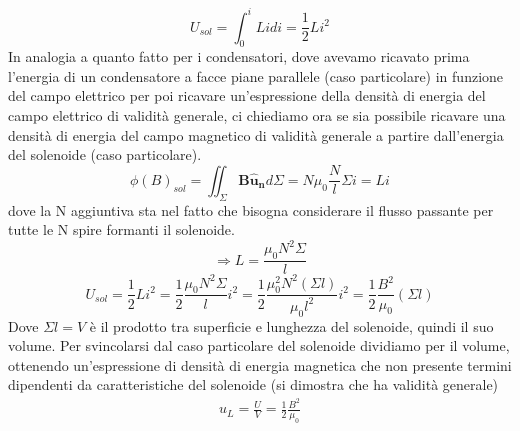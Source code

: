 \documentclass[
10pt, %
a4paper, %
oneside, %
headinclude,footinclude, %
BCOR5mm, %
]{scrartcl}
\begin{document}
\[U_{sol} = \int_{0}^{i}Lidi=\frac{1}{2}Li^2\]
In analogia a quanto fatto per i condensatori, dove avevamo ricavato prima l'energia di un condensatore a facce piane parallele (caso particolare) in funzione del campo elettrico per poi ricavare un'espressione della densità di energia del campo elettrico di validità generale, ci chiediamo ora se sia possibile ricavare una densità di energia del campo magnetico di validità generale a partire dall'energia del solenoide (caso particolare). 
\[\phi(B)_{sol} = \iint_{\Sigma}\mathbf{B}\mathbf{\hat{u}_n}d\Sigma = N \mu_0 \frac{N}{l}\Sigma i = Li\]
dove la N aggiuntiva sta nel fatto che bisogna considerare il flusso passante per tutte le N spire formanti il solenoide.\\
\[\Rightarrow L = \frac{\mu_0 N^2\Sigma}{l}\]
\[U_{sol} = \frac{1}{2}Li^2 = \frac{1}{2}\frac{\mu_0 N^2\Sigma}{l}i^2=\frac{1}{2}\frac{\mu_0^2 N^2(\Sigma l)}{\mu_0 l^2}i^2=\frac{1}{2}\frac{B^2}{\mu_0}(\Sigma l)\]
Dove \(\Sigma l= V \) è il prodotto tra superficie e lunghezza del solenoide, quindi il suo volume. Per svincolarsi dal caso particolare del solenoide dividiamo per il volume, ottenendo un'espressione di densità di energia magnetica che non presente termini dipendenti da caratteristiche del solenoide (si dimostra che ha validità generale)
\begin{align}\label{eq:densità_energia_magnetica}
u_L = \frac{U}{V} =\frac{1}{2}\frac{B^2}{\mu_0} 
\end{align}
\end{document}
